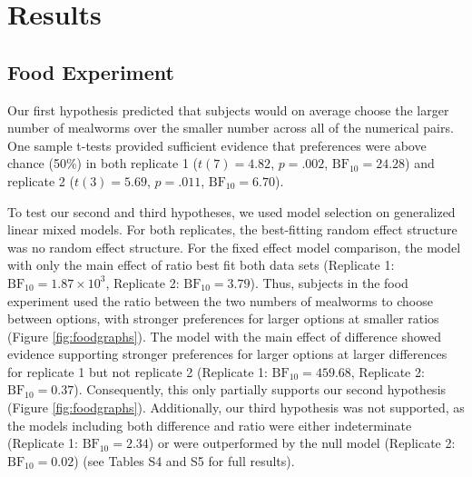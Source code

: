 \documentclass[
  ,pub,floatsintext]{apa6}
\begin{document}
\hypertarget{results}{%
\section{Results}\label{results}}

\hypertarget{food-experiment-1}{%
\subsection{Food Experiment}\label{food-experiment-1}}

Our first hypothesis predicted that subjects would on average choose the larger number of mealworms over the smaller number across all of the numerical pairs. One sample t-tests provided sufficient evidence that preferences were above chance (50\%) in both replicate 1 (\(t(7) = 4.82\), \(p = .002\), \(\mathrm{BF}_{\textrm{10}} = 24.28\)) and replicate 2 (\(t(3) = 5.69\), \(p = .011\), \(\mathrm{BF}_{\textrm{10}} = 6.70\)).

To test our second and third hypotheses, we used model selection on generalized linear mixed models. For both replicates, the best-fitting random effect structure was no random effect structure. For the fixed effect model comparison, the model with only the main effect of ratio best fit both data sets (Replicate 1: \(\mathrm{BF}_{\textrm{10}} = 1.87 \times 10^{3}\), Replicate 2: \(\mathrm{BF}_{\textrm{10}} = 3.79\)). Thus, subjects in the food experiment used the ratio between the two numbers of mealworms to choose between options, with stronger preferences for larger options at smaller ratios (Figure \ref{fig:foodgraphs}). The model with the main effect of difference showed evidence supporting stronger preferences for larger options at larger differences for replicate 1 but not replicate 2 (Replicate 1: \(\mathrm{BF}_{\textrm{10}} = 459.68\), Replicate 2: \(\mathrm{BF}_{\textrm{10}} = 0.37\)). Consequently, this only partially supports our second hypothesis (Figure \ref{fig:foodgraphs}). Additionally, our third hypothesis was not supported, as the models including both difference and ratio were either indeterminate (Replicate 1: \(\mathrm{BF}_{\textrm{10}} = 2.34\)) or were outperformed by the null model (Replicate 2: \(\mathrm{BF}_{\textrm{10}} = 0.02\)) (see Tables S4 and S5 for full results).
\end{document}
